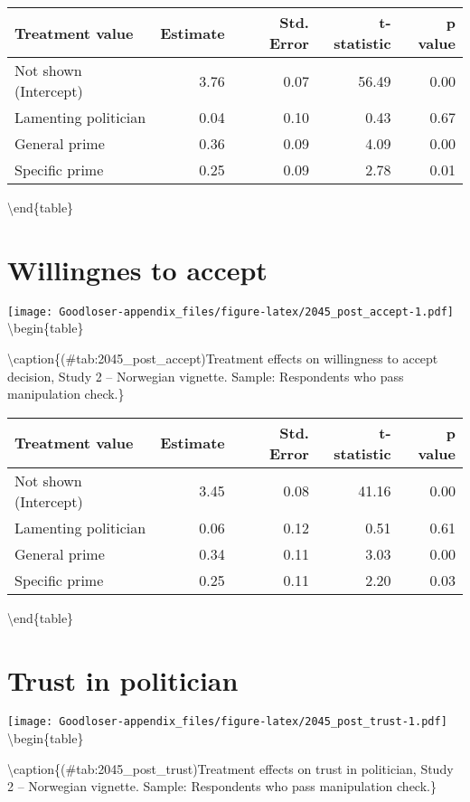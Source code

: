 \documentclass[
]{book}
\begin{document}
\begin{tabular}[t]{lrrrr}
\toprule
Treatment value & Estimate & Std. Error & t-statistic & p value\\
\midrule
Not shown (Intercept) & 3.76 & 0.07 & 56.49 & 0.00\\
Lamenting politician & 0.04 & 0.10 & 0.43 & 0.67\\
General prime & 0.36 & 0.09 & 4.09 & 0.00\\
Specific prime & 0.25 & 0.09 & 2.78 & 0.01\\
\bottomrule
\end{tabular}

\textbackslash end\{table\}

\hypertarget{willingnes-to-accept-1}{%
\section{Willingnes to accept}\label{willingnes-to-accept-1}}

\texttt{[image: Goodloser-appendix\_files/figure-latex/2045\_post\_accept-1.pdf]} \textbackslash begin\{table\}

\textbackslash caption\{(\#tab:2045\_post\_accept)Treatment effects on willingness to accept decision, Study 2 -- Norwegian vignette. Sample: Respondents who pass manipulation check.\}
\centering

\begin{tabular}[t]{lrrrr}
\toprule
Treatment value & Estimate & Std. Error & t-statistic & p value\\
\midrule
Not shown (Intercept) & 3.45 & 0.08 & 41.16 & 0.00\\
Lamenting politician & 0.06 & 0.12 & 0.51 & 0.61\\
General prime & 0.34 & 0.11 & 3.03 & 0.00\\
Specific prime & 0.25 & 0.11 & 2.20 & 0.03\\
\bottomrule
\end{tabular}

\textbackslash end\{table\}

\hypertarget{trust-in-politician-1}{%
\section{Trust in politician}\label{trust-in-politician-1}}

\texttt{[image: Goodloser-appendix\_files/figure-latex/2045\_post\_trust-1.pdf]} \textbackslash begin\{table\}

\textbackslash caption\{(\#tab:2045\_post\_trust)Treatment effects on trust in politician, Study 2 -- Norwegian vignette. Sample: Respondents who pass manipulation check.\}
\centering
\end{document}
